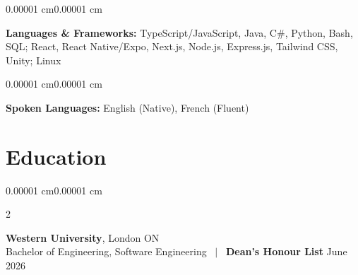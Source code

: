 \documentclass[letterpaper]{article}
\newenvironment{onecolentry}{
    \begin{adjustwidth}{0.00001 cm}{0.00001 cm}
}{
    \end{adjustwidth}
}
\newenvironment{twocolentry}[2][2.2cm]{%
    \onecolentry
    \def\secondColumn{#2}%
    \setcolumnwidth{\fill, #1}%
    \begin{paracol}{2}%
}{%
    \switchcolumn \raggedleft \secondColumn
    \end{paracol}
    \endonecolentry
}
\begin{document}
    \begin{onecolentry}
        \textbf{Languages \& Frameworks:} TypeScript/JavaScript, Java, C\#, Python, Bash, SQL; React, React Native/Expo, Next.js, Node.js, Express.js, Tailwind CSS, Unity; Linux
    \end{onecolentry}
    \vspace{0.098 cm}
    \begin{onecolentry}
        \textbf{Spoken Languages:} English (Native), French (Fluent)
    \end{onecolentry}

    \section{Education}

    \begin{twocolentry}{June 2026}
        \textbf{Western University}, London ON\\
        Bachelor of Engineering, Software Engineering ~$|$~ \textbf{Dean's Honour List}
    \end{twocolentry}
\end{document}
